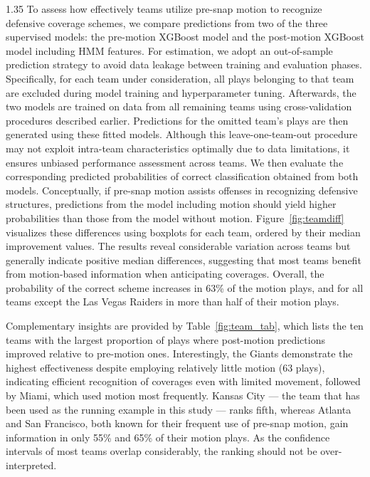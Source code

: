 \documentclass[12pt,a4paper]{article}
\begin{document}
\begin{spacing}{1.35}
To assess how effectively teams utilize pre-snap motion to recognize defensive coverage schemes, we compare predictions from two of the three supervised models: the pre-motion XGBoost model and the post-motion XGBoost model including HMM features. For estimation, we adopt an out-of-sample prediction strategy to avoid data leakage between training and evaluation phases. Specifically, for each team under consideration, all plays belonging to that team are excluded during model training and hyperparameter tuning. Afterwards, the two models are trained on data from all remaining teams using cross-validation procedures described earlier. Predictions for the omitted team’s plays are then generated using these fitted models. Although this leave-one-team-out procedure may not exploit intra-team characteristics optimally due to data limitations, it ensures unbiased performance assessment across teams. We then evaluate the corresponding predicted probabilities of correct classification obtained from both models. Conceptually, if pre-snap motion assists offenses in recognizing defensive structures, predictions from the model including motion should yield higher probabilities than those from the model without motion.
Figure~\ref{fig:teamdiff} visualizes these differences using boxplots for each team, ordered by their median improvement values. The results reveal considerable variation across teams but generally indicate positive median differences, suggesting that most teams benefit from motion-based information when anticipating coverages. Overall, the probability of the correct scheme increases in 63\% of the motion plays, and for all teams except the Las Vegas Raiders in more than half of their motion plays.

Complementary insights are provided by Table~\ref{fig:team_tab}, which lists the ten teams with the largest proportion of plays where post-motion predictions improved relative to pre-motion ones. Interestingly, the Giants demonstrate the highest effectiveness despite employing relatively little motion (63 plays), indicating efficient recognition of coverages even with limited movement, followed by Miami, which used motion most frequently. Kansas City --- the team that has been used as the running example in this study --- ranks fifth, whereas Atlanta and San Francisco, both known for their frequent use of pre-snap motion, gain information in only 55\% and 65\% of their motion plays. As the confidence intervals of most teams overlap considerably, the ranking should not be over-interpreted.


\end{spacing}
\end{document}
